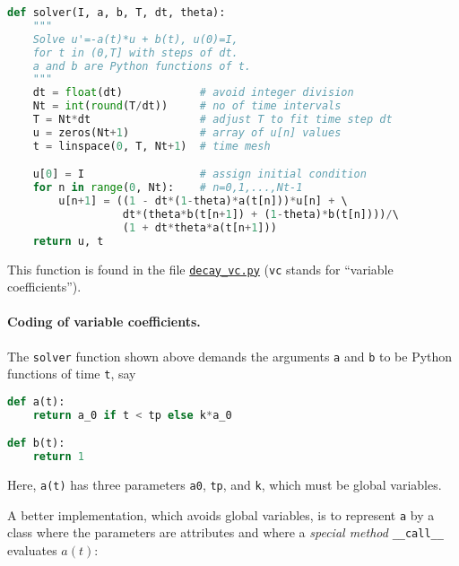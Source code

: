 \documentclass[graybox,sectrefs,envcountresetchap,open=right,final]{svmonodo}
\begin{document}
\begin{lstlisting}[language=python,style=blue1_bluegreen]
def solver(I, a, b, T, dt, theta):
    """
    Solve u'=-a(t)*u + b(t), u(0)=I,
    for t in (0,T] with steps of dt.
    a and b are Python functions of t.
    """
    dt = float(dt)            # avoid integer division
    Nt = int(round(T/dt))     # no of time intervals
    T = Nt*dt                 # adjust T to fit time step dt
    u = zeros(Nt+1)           # array of u[n] values
    t = linspace(0, T, Nt+1)  # time mesh

    u[0] = I                  # assign initial condition
    for n in range(0, Nt):    # n=0,1,...,Nt-1
        u[n+1] = ((1 - dt*(1-theta)*a(t[n]))*u[n] + \ 
                  dt*(theta*b(t[n+1]) + (1-theta)*b(t[n])))/\ 
                  (1 + dt*theta*a(t[n+1]))
    return u, t

\end{lstlisting}

This function is found in the file \href{{http://tinyurl.com/ofkw6kc/genz/decay_vc.py}}{\nolinkurl{decay_vc.py}} (\texttt{vc} stands for ``variable coefficients'').

\paragraph{Coding of variable coefficients.}
The \texttt{solver} function shown above demands the arguments \texttt{a} and \texttt{b} to
be Python functions of time \texttt{t}, say







\begin{lstlisting}[language=python,style=blue1_bluegreen]
def a(t):
    return a_0 if t < tp else k*a_0

def b(t):
    return 1

\end{lstlisting}

Here, \texttt{a(t)} has three parameters \texttt{a0}, \texttt{tp}, and \texttt{k},
which must be global variables.

A better implementation, which avoids global variables,
is to represent \texttt{a} by a class where the
parameters are attributes and where a \emph{special method} \Verb!__call__!
evaluates $a(t)$:
\end{document}
